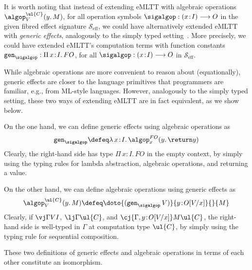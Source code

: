 It is worth noting that instead of extending eMLTT with algebraic operations $\algop^{\ul{C}}_V(y.\, M)$, for all operation symbols $\sigalgop : (x \!:\! I) \longrightarrow O$ in the given fibred effect signature $\mathcal{S}_{\text{eff}}$, we could have alternatively extended eMLTT with \emph{generic effects}, analogously to the simply typed setting~\cite{Plotkin:AlgOperations}. More precisely, we could have extended eMLTT's computation terms with function constants $\mathtt{gen}_{\sigalgop} : \Pi\, x \!:\! I .\, FO$, for all $\sigalgop : (x \!:\! I) \longrightarrow O$ in $\mathcal{S}_{\text{eff}}$.

While algebraic operations are more convenient to reason about (equationally), generic effects are closer to the language primitives that programmers are familiar, e.g., from ML-style languages. 
However, analogously to the simply typed setting, these two ways of extending eMLTT are in fact equivalent, as we show below. 

On the one hand, we can define generic effects using algebraic operations as
\[
\mathtt{gen}_{\sigalgop} \defeq  \lambda\, x \!:\! I .\, \algop^{FO}_x(y.\, \return y)
\]
Clearly, the right-hand side has type $\Pi\, x \!:\! I .\, FO$ in the empty context, by simply using the typing rules for lambda abstraction, algebraic operations, and returning a value.

On the other hand, we can define algebraic operations using generic effects as
\[
\algop^{\ul{C}}_V(y.\, M) \defeq \doto {(\mathtt{gen}_{\sigalgop}\, V)} {y \!:\! O[V/x]} {} {M}
\]
Clearly, if $\vj \Gamma V I$, $\lj \Gamma {\ul{C}}$, and $\cj {\Gamma, y \!:\! O[V/x]} M {\ul{C}}$, the right-hand side is well-typed in $\Gamma$ at computation type $\ul{C}$, by simply using the typing rule for sequential composition.

\begin{proposition}
These two definitions of generic effects and algebraic operations in terms of each other constitute an isomorphism. 
\end{proposition}

